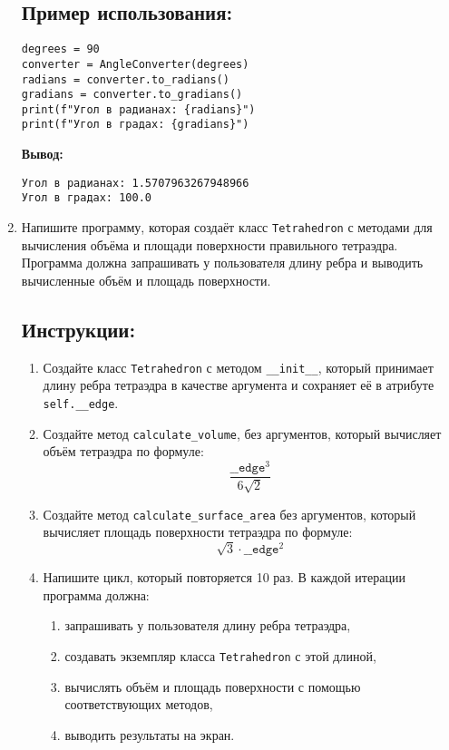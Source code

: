 \begin{enumerate}
\subsection*{Пример использования:}
\begin{verbatim}
degrees = 90
converter = AngleConverter(degrees)
radians = converter.to_radians()
gradians = converter.to_gradians()
print(f"Угол в радианах: {radians}")
print(f"Угол в градах: {gradians}")
\end{verbatim}

\textbf{Вывод:}
\begin{verbatim}
Угол в радианах: 1.5707963267948966
Угол в градах: 100.0
\end{verbatim}

\item
Напишите программу, которая создаёт класс \texttt{Tetrahedron} с методами для вычисления объёма
и площади поверхности правильного тетраэдра. Программа должна запрашивать у пользователя длину ребра
и выводить вычисленные объём и площадь поверхности.

\subsection*{Инструкции:}
\begin{enumerate}
\item Создайте класс \texttt{Tetrahedron} с методом
\texttt{\_\_init\_\_}, который принимает длину ребра тетраэдра в
качестве аргумента и сохраняет её в атрибуте \texttt{self.\_\_edge}.

\item Создайте метод \texttt{calculate\_volume},
без аргументов, который вычисляет объём тетраэдра по формуле:
\[
\frac{\texttt{\_\_edge}^3}{6\sqrt{2}}
\]

\item Создайте метод \texttt{calculate\_surface\_area} без аргументов,
который вычисляет площадь поверхности тетраэдра по формуле:
\[
\sqrt{3} \cdot \texttt{\_\_edge}^2
\]

\item Напишите цикл, который повторяется 10 раз. В каждой итерации программа должна:
\begin{enumerate}
\item запрашивать у пользователя длину ребра тетраэдра,
\item создавать экземпляр класса \texttt{Tetrahedron} с этой длиной,
\item вычислять объём и площадь поверхности с помощью соответствующих методов,
\item выводить результаты на экран.
\end{enumerate}
\end{enumerate}


\end{enumerate}
